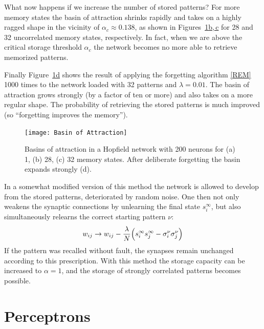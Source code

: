 What now happens if we increase the number of stored patterns? For more memory states the basin of attraction shrinks rapidly and takes on a highly ragged shape in the vicinity of $\alpha_c\approx0.138$, as shown in Figures~\hyperref[BasinofAttraction]{\ref*{BasinofAttraction}b,\,c} for 28 and 32 uncorrelated memory states, respectively. In fact, when we are above the critical storage threshold $\alpha_c$ the network becomes no more able to retrieve memorized patterns.

Finally Figure~\hyperref[BasinofAttraction]{\ref*{BasinofAttraction}d} shows the result of applying the forgetting algorithm \eqref{REM} 1000 times to the network loaded with 32 patterns and $\lambda=0.01$. The basin of attraction grows strongly (by a factor of ten or more) and also takes on a more regular shape. The probability of retrieving the stored patterns is much improved (so ``forgetting improves the memory'').
\begin{figure}[h!t]
\centering
\texttt{[image: Basin of Attraction]}\hspace{7pt}
\caption{Basins of attraction in a Hopfield network with 200 neurons for (a) 1, (b) 28, (c) 32 memory states. After deliberate forgetting the basin expands strongly (d).}\label{BasinofAttraction}
\end{figure}

{\small
In a somewhat modified version of this method the network is allowed to develop from the stored patterns, deteriorated by random noise. One then not only weakens the synaptic connections by unlearning the final state $s_i^\infty$, but also simultaneously relearns the correct starting pattern $\nu$:
\begin{equation}\label{REMmodified}
w_{ij}\rightarrow w_{ij}-\frac{\lambda}{N}\Bigl(s_i^\infty s_j^\infty-\sigma_i^\nu\sigma_j^\nu\Bigr)
\end{equation}
If the pattern was recalled without fault, the synapses remain unchanged according to this prescription. With this method the storage capacity can be increased to $\alpha=1$, and the storage of strongly correlated patterns becomes possible.\par}

\section{Perceptrons}
